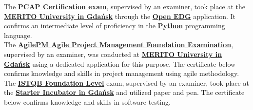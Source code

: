     \begin{rightcolumn}\noindent \small 
        \hspace{-2.4pt}
            {The \href{https://pythoninstitute.org/pcap}{\textbf{PCAP Certification exam}}, supervised by an examiner, took place at the \href{https://www.merito.pl/english/gdansk/}{\textbf{MERITO University in Gdańsk}} through the \href{https://openedg.org/}{\textbf{Open EDG}} application. It confirms an intermediate level of proficiency in the \href{https://www.python.org/}{\textbf{Python}} programming language.}
        \vspace{\itemspace}\\
            {The \href{https://apmg-international.com/product/agilepm/foundation}{\textbf{AgilePM Agile Project Management Foundation Examination}}, supervised by an examiner, was conducted at \href{https://www.merito.pl/english/gdansk/}{\textbf{MERITO University in Gdańsk}} using a dedicated application for this purpose. The certificate below confirms knowledge and skills in project management using agile methodology.}
        \vspace{\itemspace}\\
            {The \href{https://www.istqb.org/certifications/certified-tester-foundation-level}{\textbf{ISTQB Foundation Level}} exam, supervised by an examiner, took place at the \href{https://inkubatorstarter.pl/}{\textbf{Starter Incubator in Gdańsk}} and utilized paper and pen. The certificate below confirms knowledge and skills in software testing.}

\end{rightcolumn}
